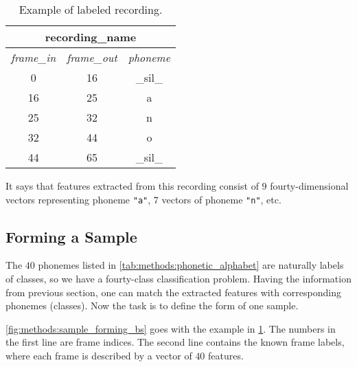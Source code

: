 \begin{table}[H]
\centering
\begin{tabular}{|c|c|c|}
\hline
\multicolumn{3}{|c|}{recording\_name}                                                                                     \\ \hline
\multicolumn{1}{|l|}{\textit{frame\_in}} & \multicolumn{1}{l|}{\textit{frame\_out}} & \multicolumn{1}{l|}{\textit{phoneme}} \\ \hline
0                                       & 16                                      & \_sil\_                               \\ \hline
16                                      & 25                                      & a                                     \\ \hline
25                                      & 32                                      & n                                     \\ \hline
32                                      & 44                                      & o                                     \\ \hline
44                                      & 65                                      & \_sil\_                               \\ \hline
\end{tabular}
\caption{Example of labeled recording.}
\label{tab:methods:labeling_example}
\end{table}

It says that features extracted from this recording consist of $ 9 $ fourty-dimensional vectors representing phoneme \texttt{"a"}, $ 7 $ vectors of phoneme \texttt{"n"}, etc.

\subsection*{Forming a Sample}
The $ 40 $ phonemes listed in \cref{tab:methods:phonetic_alphabet} are naturally labels of classes, so we have a fourty-class classification problem. Having the information from previous section, one can match the extracted features with corresponding phonemes (classes). Now the task is to define the form of one sample.

\cref{fig:methods:sample_forming_bs} goes with the example in \cref{tab:methods:labeling_example}. The numbers in the first line are frame indices. The second line contains the known frame labels, where each frame is described by a vector of $ 40 $ features.

